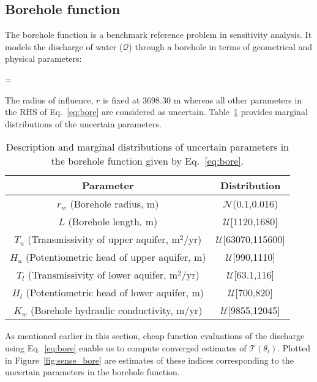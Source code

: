 \subsection{Borehole function}

The borehole function is a benchmark reference problem in sensitivity analysis. It models the discharge
of water ($\mathcal{Q}$) through a borehole in terms of geometrical and physical parameters:

\be
{} = 
\label{eq:bore}
\ee

\noindent The radius of influence, $r$ is fixed at 3698.30 m whereas all other parameters
in the RHS of Eq.~\ref{eq:bore} are considered as uncertain. Table~\ref{tab:bore} provides
marginal distributions of the uncertain parameters. 

\begin{table}[htbp]
\renewcommand*{\arraystretch}{1.2}
\begin{center}
\begin{tabular}{|c|c|}
\hline
Parameter & Distribution \\ \hline \hline
$r_w$ (Borehole radius, m) & $\mathcal{N}$(0.1,0.016) \\
$L$ (Borehole length, m) & $\mathcal{U}$[1120,1680] \\
$T_u$ (Transmissivity of upper aquifer, m$^2$/yr) & $\mathcal{U}$[63070,115600] \\
$H_u$ (Potentiometric head of upper aquifer, m) & $\mathcal{U}$[990,1110] \\
$T_l$ (Transmissivity of lower aquifer, m$^2$/yr) & $\mathcal{U}$[63.1,116] \\
$H_l$ (Potentiometric head of lower aquifer, m) & $\mathcal{U}$[700,820] \\
$K_w$ (Borehole hydraulic conductivity, m/yr) & $\mathcal{U}$[9855,12045] \\
\hline
\end{tabular}
\end{center}

\caption{Description and marginal distributions of uncertain parameters in the borehole function
given by Eq.~\ref{eq:bore}.}
\label{tab:bore}
\end{table}

As mentioned earlier in this section, cheap function evaluations of the discharge using 
Eq.~\ref{eq:bore} enable us to compute converged estimates of $\mathcal{T}(\theta_i)$. Plotted in
Figure~\ref{fig:sense_bore} are estimates of these indices corresponding to the uncertain
parameters in the borehole function.




